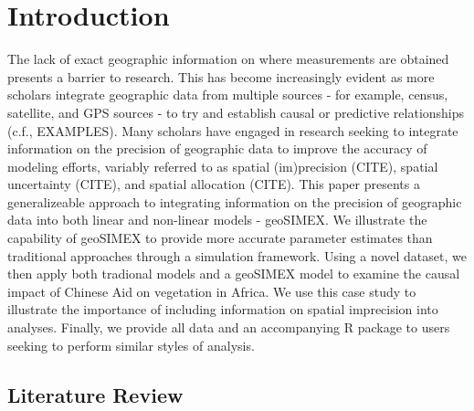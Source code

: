 \section{Introduction}
The lack of exact geographic information on where measurements are obtained presents a barrier to research.
This has become increasingly evident as more scholars integrate geographic data from multiple sources - for example, census, satellite, and GPS sources - to try and establish causal or predictive relationships (c.f., EXAMPLES).
Many scholars have engaged in research seeking to integrate information on the precision of geographic data to improve the accuracy of modeling efforts, variably referred to as spatial (im)precision (CITE), spatial uncertainty (CITE), and spatial allocation (CITE).
This paper presents a generalizeable approach to integrating information on the precision of geographic data into both linear and non-linear models - geoSIMEX.
We illustrate the capability of geoSIMEX to provide more accurate parameter estimates than traditional approaches through a simulation framework. 
Using a novel dataset, we then apply both tradional models and a geoSIMEX model to examine the causal impact of Chinese Aid on vegetation in Africa.
We use this case study to illustrate the importance of including information on spatial imprecision into analyses.
Finally, we provide all data and an accompanying R package to users seeking to perform similar styles of analysis.
\subsection{Literature Review}

